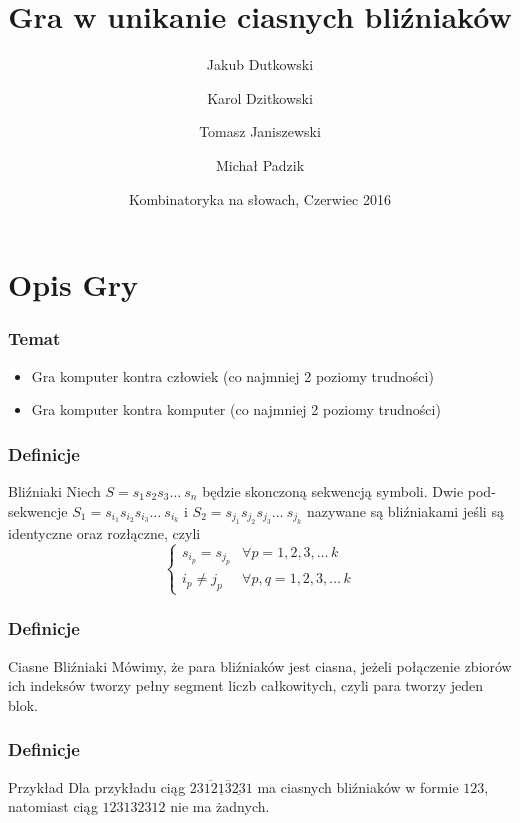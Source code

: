 \documentclass{beamer}
\title{
	Gra w unikanie ciasnych bliźniaków\\
}
\author{
	Jakub Dutkowski \and
	Karol Dzitkowski \and
	Tomasz Janiszewski \and
	Michał Padzik
}
\institute[MiniPW] %
{
  Wydział Matematyki i Nauk Informacyjnych\\ Politechnika Warszawska
}
\date[VLC 2013] %
{Kombinatoryka na słowach, Czerwiec 2016}
\begin{document}
\frame{\titlepage}
\begin{frame}
\tableofcontents
\end{frame}

\section{Opis Gry}

\begin{frame}
\frametitle{Temat}
	\begin{itemize}
		\item Gra komputer kontra człowiek (co najmniej 2 poziomy trudności)
		\item Gra komputer kontra komputer (co najmniej 2 poziomy trudności)
	\end{itemize}
\end{frame}

\begin{frame}
\frametitle{Definicje}
	\begin{block}{Bliźniaki}\label{def:blizniak}
Niech
$S = s_1 s_2 s_3 \ldots\ s_n$
będzie skonczoną sekwencją symboli. Dwie pod-sekwencje
$S_1 = s_{i_1} s_{i_2} s_{i_3} \ldots\ s_{i_k}$
i
$S_2 = s_{j_1} s_{j_2} s_{j_3} \ldots\ s_{j_k}$
nazywane są bliźniakami jeśli są identyczne oraz rozłączne, czyli
$$
\left\{ \begin{array}{ll}
s_{i_p} = s_{j_p} &\forall p = {1, 2, 3, \ldots\, k} \\
i_p \neq j_p &\forall p,q = {1, 2, 3, \ldots\, k}
\end{array} \right.
$$
	\end{block}
\end{frame}

\begin{frame}
\frametitle{Definicje}
	\begin{block}{Ciasne Bliźniaki}\label{def:ciasne_blizniak}
Mówimy, że para bliźniaków jest ciasna,
jeżeli połączenie zbiorów ich indeksów tworzy pełny segment
liczb całkowitych,
czyli para tworzy jeden blok.
	\end{block}
\end{frame}

\begin{frame}
\frametitle{Definicje}
	\begin{examples}{Przykład}
Dla przykładu ciąg
$23\overline{12}\underline{1}\overline{3}\underline{23}1$
ma ciasnych bliźniaków
w formie $123$, natomiast ciąg $123132312$ nie ma żadnych.
	\end{examples}
\end{frame}
\end{document}
